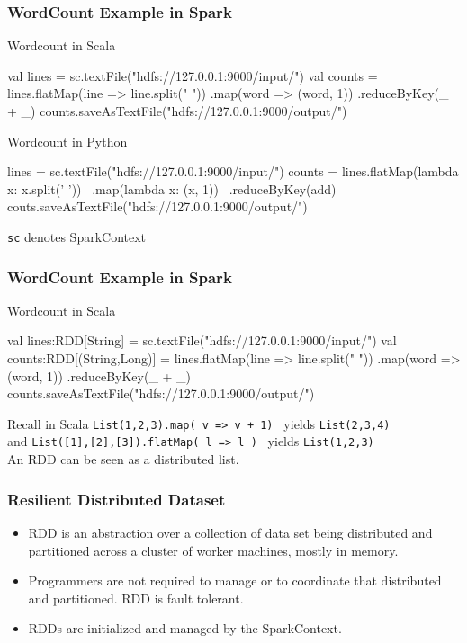\documentclass{beamer}
\newcommand{\beb}{\begin{exampleblock}}
\newcommand{\eeb}{\end{exampleblock}}
\begin{document}
\begin{frame}[fragile]
\frametitle{WordCount Example in Spark}

\beb{Wordcount in Scala} 
\begin{code}
val lines = sc.textFile("hdfs://127.0.0.1:9000/input/")
val counts = lines.flatMap(line => line.split(" "))
    .map(word => (word, 1))
    .reduceByKey(_ + _)
counts.saveAsTextFile("hdfs://127.0.0.1:9000/output/")
\end{code} \eeb

\beb{Wordcount in Python}
\begin{code}
lines = sc.textFile("hdfs://127.0.0.1:9000/input/")
counts = lines.flatMap(lambda x: x.split(' ')) \
              .map(lambda x: (x, 1)) \
              .reduceByKey(add)
couts.saveAsTextFile("hdfs://127.0.0.1:9000/output/")
\end{code} \eeb
{\tt sc} denotes SparkContext 
\end{frame}




\begin{frame}[fragile]
\frametitle{WordCount Example in Spark}

\beb{Wordcount in Scala} 
\begin{code}
val lines:RDD[String] = 
    sc.textFile("hdfs://127.0.0.1:9000/input/")
val counts:RDD[(String,Long)] = 
    lines.flatMap(line => line.split(" "))
    .map(word => (word, 1))
    .reduceByKey(_ + _)
counts.saveAsTextFile("hdfs://127.0.0.1:9000/output/")
\end{code} \eeb
Recall in Scala {\tt  List(1,2,3).map( v => v + 1) }
yields  {\tt List(2,3,4) } \\ 
and {\tt List([1],[2],[3]).flatMap( l => l ) } 
yields
{\tt List(1,2,3) }
\\
An RDD can be seen as a distributed list. 
\end{frame}


\begin{frame}[fragile]
\frametitle{Resilient Distributed Dataset}

\begin{itemize} 
\item RDD is an abstraction over a collection of data set being distributed
and partitioned across a cluster of worker machines, mostly in memory.
\item Programmers are not required to manage or to coordinate that
distributed and partitioned. RDD is fault tolerant.  
\item RDDs are initialized and managed by the SparkContext.
\end{itemize}
\end{frame}
\end{document}

